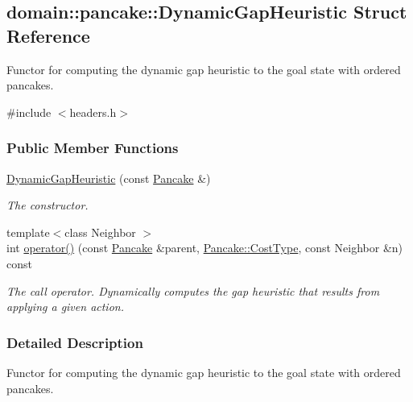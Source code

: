 \hypertarget{structdomain_1_1pancake_1_1DynamicGapHeuristic}{}\subsection{domain\+:\+:pancake\+:\+:Dynamic\+Gap\+Heuristic Struct Reference}
\label{structdomain_1_1pancake_1_1DynamicGapHeuristic}


Functor for computing the dynamic gap heuristic to the goal state with ordered pancakes.  




{\ttfamily \#include $<$headers.\+h$>$}

\subsubsection*{Public Member Functions}
\begin{DoxyCompactItemize}
\item 
\hyperlink{structdomain_1_1pancake_1_1DynamicGapHeuristic_a07309831bacb18920f9b3b2a6f4b72a2}{Dynamic\+Gap\+Heuristic} (const \hyperlink{structdomain_1_1pancake_1_1Pancake}{Pancake} \&)\hypertarget{structdomain_1_1pancake_1_1DynamicGapHeuristic_a07309831bacb18920f9b3b2a6f4b72a2}{}\label{structdomain_1_1pancake_1_1DynamicGapHeuristic_a07309831bacb18920f9b3b2a6f4b72a2}

\begin{DoxyCompactList}\small\item\em The constructor. \end{DoxyCompactList}\item 
{\footnotesize template$<$class Neighbor $>$ }\\int \hyperlink{structdomain_1_1pancake_1_1DynamicGapHeuristic_ad53e1c9a3fd4e4cc5191ff61ca5f3ba1}{operator()} (const \hyperlink{structdomain_1_1pancake_1_1Pancake}{Pancake} \&parent, \hyperlink{structdomain_1_1pancake_1_1Pancake_a7805c33e70c8dd2859c7e93148575239}{Pancake\+::\+Cost\+Type}, const Neighbor \&n) const 
\begin{DoxyCompactList}\small\item\em The call operator. Dynamically computes the gap heuristic that results from applying a given action. \end{DoxyCompactList}\end{DoxyCompactItemize}


\subsubsection{Detailed Description}
Functor for computing the dynamic gap heuristic to the goal state with ordered pancakes. 

